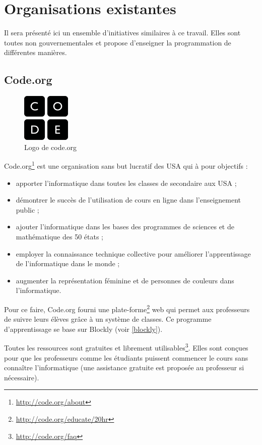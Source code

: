 \section{Organisations existantes}
Il sera présenté ici un ensemble d'initiatives similaires à ce travail. Elles sont toutes non gouvernementales et propose d'enseigner la programmation de différentes manières.
\subsection{Code.org}
\begin{figure}[!h]
  \begin{center}
    \includegraphics[scale=0.5]{content/5-related_work/images/code}
    \caption{Logo de code.org}
    \label{fig:code.org}
  \end{center}
\end{figure}
Code.org\footnote{\url{http://code.org/about}} est une organisation sans but lucratif des USA qui à pour objectifs :
\begin{itemize}
  \item apporter l'informatique dans toutes les classes de secondaire aux USA ;
  \item démontrer le succès de l'utilisation de cours en ligne dans l'enseignement public ;
  \item ajouter l'informatique dans les bases des programmes de sciences et de mathématique des 50 états ;
  \item employer la connaissance technique collective pour améliorer l'apprentissage de l'informatique dans le monde ;
  \item augmenter la représentation féminine et de personnes de couleurs dans l'informatique.
\end{itemize}

Pour ce faire, Code.org fourni une plate-forme\footnote{\url{http://code.org/educate/20hr}} web qui permet aux professeurs de suivre leurs élèves grâce à un système de classes. Ce programme d'apprentissage se base sur Blockly (voir \ref{blockly}).

Toutes les ressources sont gratuites et librement utilisables\footnote{\url{http://code.org/faq}}. Elles sont conçues pour que les professeurs comme les étudiants puissent commencer le cours sans connaître l'informatique (une assistance gratuite est proposée au professeur si nécessaire).

